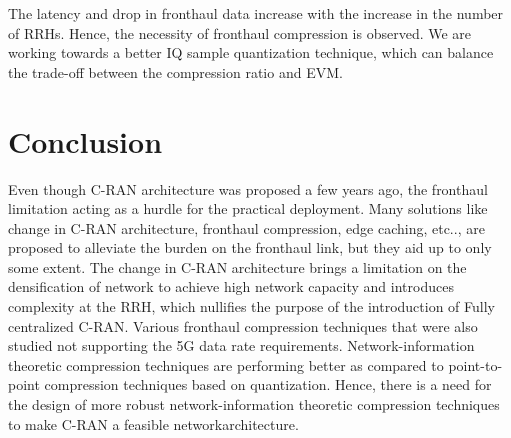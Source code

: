 \begin{multicols}{2}
\begin{itemize}
The latency and drop in fronthaul data increase with the increase in the number of RRHs. Hence, the necessity of fronthaul compression is observed. We are working towards a better IQ sample quantization technique, which can balance the trade-off between the compression ratio and EVM.
\end{itemize}

\section{Conclusion}\label{sect08}

Even though C-RAN architecture was proposed a few years ago, the fronthaul limitation acting as a hurdle for the practical deployment. Many solutions like change in C-RAN architecture, fronthaul compression, edge caching, etc.., are proposed to alleviate the burden on the fronthaul link, but they aid up to only some extent. The change in C-RAN architecture brings a limitation on the densification of network to achieve high network capacity and introduces complexity at the RRH, which nullifies the purpose of the introduction of Fully centralized C-RAN. Various fronthaul compression techniques that were also studied not supporting the 5G data rate requirements. Network-information theoretic compression techniques are performing better as compared to point-to-point compression techniques based on quantization. Hence, there is a need for the design of more robust network-information theoretic compression techniques to make C-RAN a feasible network\break architecture.


\end{multicols}
